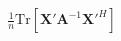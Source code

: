 \documentclass[10pt]{article}
\begin{document}
\begin{align*}\frac{1}{n} \mathrm{Tr} \left[ \boldsymbol X' \boldsymbol A^{-1} \boldsymbol X'^H \right]\end{align*}
\end{document}
